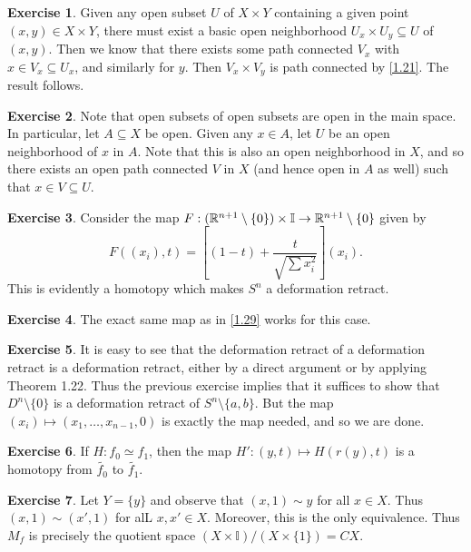 \documentclass[10pt]{article}
\theoremstyle{definition}
\newtheorem{intex}{Exercise}[section]
\newenvironment{exercise}{\begin{intex}\label{\theintex}}{\end{intex}}
\newcommand*\II{\mathbb I}
\begin{document}
\begin{exercise} \leavevmode
Given any open subset $U$ of $X\times Y$ containing a given point $(x,y)\in X\times Y$, there must exist a basic open neighborhood $U_x\times U_y\subseteq U$ of $(x,y)$. Then we know that there exists some path connected $V_x$ with $x\in V_x\subseteq U_x$, and similarly for $y$. Then $V_x\times V_y$ is path connected by \cref{1.21}. The result follows. 
\end{exercise} 

\begin{exercise} \leavevmode
Note that open subsets of open subsets are open in the main space. In particular, let $A\subseteq X$ be open. Given any $x\in A$, let $U$ be an open neighborhood of $x$ in $A$. Note that this is also an open neighborhood in $X$, and so there exists an open path connected $V$ in $X$ (and hence open in $A$ as well) such that $x\in V\subseteq U$. 
\end{exercise} 

\begin{exercise} \leavevmode
Consider the map $F:(\RR^{n+1}\setminus\{0\})\times\II\to\RR^{n+1}\setminus\{0\}$ given by \[F((x_i),t)=\left[(1-t)+\frac t{\sqrt{\sum x_i^2}}\right](x_i).\] This is evidently a homotopy which makes $S^n$ a deformation retract. 
\end{exercise} 

\begin{exercise} \leavevmode
The exact same map as in \cref{1.29} works for this case. 
\end{exercise} 

\begin{exercise} \leavevmode
It is easy to see that the deformation retract of a deformation retract is a deformation retract, either by a direct argument or by applying Theorem 1.22. Thus the previous exercise implies that it suffices to show that $D^n\setminus\{0\}$ is a deformation retract of $S^n\setminus\{a,b\}$. But the map $(x_i)\mapsto(x_1,\dots,x_{n-1},0)$ is exactly the map needed, and so we are done. 
\end{exercise} 

\begin{exercise} \leavevmode
If $H:f_0\simeq f_1$, then the map $H':(y,t)\mapsto H(r(y),t)$ is a homotopy from $\tilde{f_0}$ to $\tilde{f_1}$. 
\end{exercise} 

\begin{exercise} \leavevmode
Let $Y=\{y\}$ and observe that $(x,1)\sim y$ for all $x\in X$. Thus $(x,1)\sim(x',1)$ for alL $x,x'\in X$. Moreover, this is the only equivalence. Thus $M_f$ is precisely the quotient space $(X\times\II)/(X\times\{1\})=CX$.
\end{exercise} 
\end{document}
